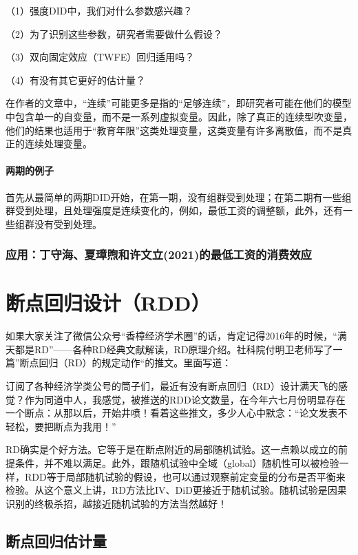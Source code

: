 \documentclass[cn,12pt,math=newtx,citestyle=gb7714-2015,bibstyle=gb7714-2015]{elegantbook}
\begin{document}
  （1）强度DID中，我们对什么参数感兴趣？
  
  （2）为了识别这些参数，研究者需要做什么假设？
  
  （3）双向固定效应（TWFE）回归适用吗？
  
  （4）有没有其它更好的估计量？
  
  在作者的文章中，“连续”可能更多是指的“足够连续”，即研究者可能在他们的模型中包含单一的自变量，而不是一系列虚拟变量。因此，除了真正的连续型吹变量，他们的结果也适用于“教育年限”这类处理变量，这类变量有许多离散值，而不是真正的连续处理变量。
  
  \subsubsection{两期的例子}
  首先从最简单的两期DID开始，在第一期，没有组群受到处理；在第二期有一些组群受到处理，且处理强度是连续变化的，例如，最低工资的调整额，此外，还有一些组群没有受到处理。
  

  
  \subsection{应用：丁守海、夏璋煦和许文立(2021)的最低工资的消费效应}
  
  
  


	\chapter{断点回归设计（RDD）}
	
	如果大家关注了微信公众号“香樟经济学术圈”的话，肯定记得2016年的时候，“满天都是RD”——各种RD经典文献解读，RD原理介绍。社科院付明卫老师写了一篇”断点回归（RD）的规定动作“的推文。里面写道：
	
	订阅了各种经济学类公号的筒子们，最近有没有断点回归（RD）设计满天飞的感觉？作为同道中人，我感觉，被推送的RDD论文数量，在今年六七月份明显存在一个断点：从那以后，开始井喷！看着这些推文，多少人心中默念：“论文发表不轻松，要把断点为我用！”
	
	RD确实是个好方法。它等于是在断点附近的局部随机试验。这一点赖以成立的前提条件，并不难以满足。此外，跟随机试验中全域（global）随机性可以被检验一样，RDD等于局部随机试验的假设，也可以通过观察前定变量的分布是否平衡来检验。从这个意义上讲，RD方法比IV、DiD更接近于随机试验。随机试验是因果识别的终极杀招，越接近随机试验的方法当然越好！
	
	\section{断点回归估计量}
	
\end{document}
